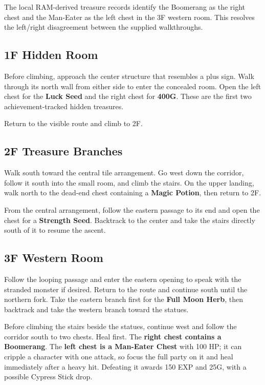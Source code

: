 \documentclass[
  american,
  10pt,
  letterpaper,
  oneside,
  open=any]{scrreprt}
\begin{document}
The local RAM-derived treasure records identify the Boomerang as the
right chest and the Man-Eater as the left chest in the 3F western room.
This resolves the left/right disagreement between the supplied
walkthroughs.

\subsection{1F Hidden Room}\label{f-hidden-room}

Before climbing, approach the center structure that resembles a plus
sign. Walk through its north wall from either side to enter the
concealed room. Open the left chest for the \textbf{Luck Seed} and the
right chest for \textbf{400G}. These are the first two
achievement-tracked hidden treasures.

Return to the visible route and climb to 2F.

\subsection{2F Treasure Branches}\label{f-treasure-branches}

Walk south toward the central tile arrangement. Go west down the
corridor, follow it south into the small room, and climb the stairs. On
the upper landing, walk north to the dead-end chest containing a
\textbf{Magic Potion}, then return to 2F.

From the central arrangement, follow the eastern passage to its end and
open the chest for a \textbf{Strength Seed}. Backtrack to the center and
take the stairs directly south of it to resume the ascent.

\subsection{3F Western Room}\label{f-western-room}

Follow the looping passage and enter the eastern opening to speak with
the stranded monster if desired. Return to the route and continue south
until the northern fork. Take the eastern branch first for the
\textbf{Full Moon Herb}, then backtrack and take the western branch
toward the statues.

Before climbing the stairs beside the statues, continue west and follow
the corridor south to two chests. Heal first. The \textbf{right chest
contains a Boomerang}. The \textbf{left chest is a Man-Eater Chest} with
100 HP; it can cripple a character with one attack, so focus the full
party on it and heal immediately after a heavy hit. Defeating it awards
150 EXP and 25G, with a possible Cypress Stick drop.
\end{document}
